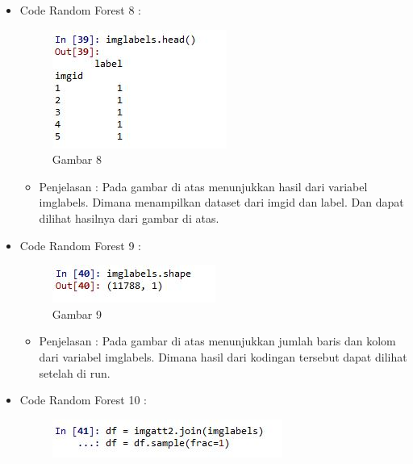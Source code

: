 \begin{enumerate}
\begin{itemize}
\begin{itemize}
\begin{itemize}
\begin{itemize}
\par
\par
\end{itemize}
\item Code Random Forest 8 :
\par
\begin{figure}[ht]
\centering
\includegraphics[scale=0.2]{figures/cod8.jpg}
\caption{Gambar 8}
\label{contoh}
\end{figure}
\par
\begin{itemize}
\item Penjelasan : Pada gambar di atas menunjukkan hasil dari variabel imglabels. Dimana menampilkan dataset dari imgid dan label. Dan dapat dilihat hasilnya dari gambar di atas.
\par
\par
\end{itemize}
\item Code Random Forest 9 :
\par
\begin{figure}[ht]
\centering
\includegraphics[scale=0.7]{figures/cod9.jpg}
\caption{Gambar 9}
\label{contoh}
\end{figure}
\par
\begin{itemize}
\item Penjelasan : Pada gambar di atas menunjukkan jumlah baris dan kolom dari variabel imglabels. Dimana hasil dari kodingan tersebut dapat dilihat setelah di run. 
\par
\par
\end{itemize}
\item Code Random Forest 10 :
\par
\begin{figure}[ht]
\centering
\includegraphics[scale=0.7]{figures/cod10.jpg}

\end{figure}
\end{itemize}
\end{itemize}
\end{itemize}
\end{enumerate}
